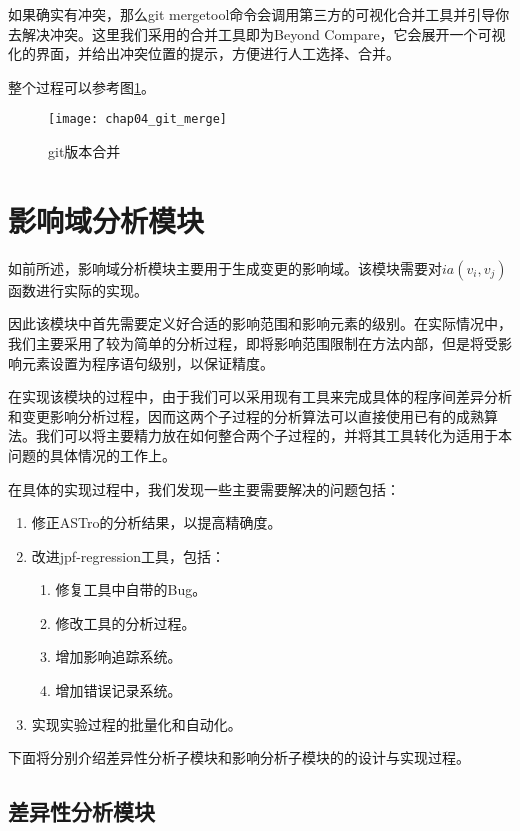 如果确实有冲突，那么git mergetool命令会调用第三方的可视化合并工具并引导你去解决冲突。这里我们采用的合并工具即为Beyond Compare，它会展开一个可视化的界面，并给出冲突位置的提示，方便进行人工选择、合并。

整个过程可以参考图\ref {git_merge}。

\begin{figure}[H]
	\centering
	\texttt{[image: chap04\_git\_merge]}
	\caption {git版本合并}
	\label {git_merge}	
\end{figure}

\section{影响域分析模块}
\label {tool_impact}

如前所述，影响域分析模块主要用于生成变更的影响域。该模块需要对$ia(v_i,v_j)$函数进行实际的实现。

因此该模块中首先需要定义好合适的影响范围和影响元素的级别。在实际情况中，我们主要采用了较为简单的分析过程，即将影响范围限制在方法内部，但是将受影响元素设置为程序语句级别，以保证精度。

在实现该模块的过程中，由于我们可以采用现有工具来完成具体的程序间差异分析和变更影响分析过程，因而这两个子过程的分析算法可以直接使用已有的成熟算法。我们可以将主要精力放在如何整合两个子过程的，并将其工具转化为适用于本问题的具体情况的工作上。

在具体的实现过程中，我们发现一些主要需要解决的问题包括：
\begin{enumerate}
	\item 修正ASTro的分析结果，以提高精确度。
	\item 改进jpf-regression工具，包括：
		\begin{enumerate}
			\item 修复工具中自带的Bug。
			\item 修改工具的分析过程。
			\item 增加影响追踪系统。
			\item 增加错误记录系统。
		\end{enumerate}
	
	\item 实现实验过程的批量化和自动化。
\end{enumerate}

下面将分别介绍差异性分析子模块和影响分析子模块的的设计与实现过程。

\subsection{差异性分析模块}

